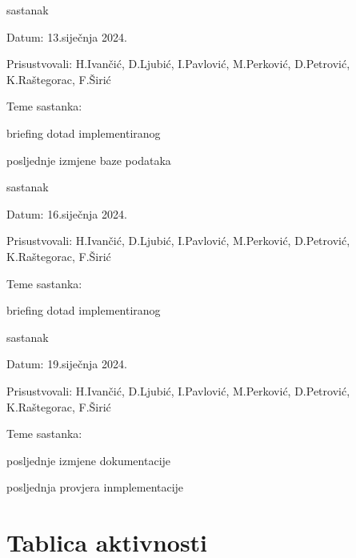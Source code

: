 \begin{packed_enum}
						\item  sastanak
		\begin{packed_item}
				\item Datum: 13.siječnja 2024.
				\item Prisustvovali: H.Ivančić, D.Ljubić, I.Pavlović, M.Perković, D.Petrović, K.Raštegorac, F.Širić
				\item Teme sastanka:
				\begin{packed_item}
					\item briefing dotad implementiranog
					\item posljednje izmjene baze podataka
				\end{packed_item}
			\end{packed_item}
			
						\item  sastanak
					\begin{packed_item}
				\item Datum: 16.siječnja 2024.
				\item Prisustvovali: H.Ivančić, D.Ljubić, I.Pavlović, M.Perković, D.Petrović, K.Raštegorac, F.Širić
				\item Teme sastanka:
				\begin{packed_item}
					\item briefing dotad implementiranog
				\end{packed_item}
			\end{packed_item}
			
						\item  sastanak					\begin{packed_item}
				\item Datum: 19.siječnja 2024.
				\item Prisustvovali: H.Ivančić, D.Ljubić, I.Pavlović, M.Perković, D.Petrović, K.Raštegorac, F.Širić
				\item Teme sastanka:
				\begin{packed_item}
					\item posljednje izmjene dokumentacije
					\item posljednja provjera inmplementacije
				\end{packed_item}
			\end{packed_item}
			
			
			
			
		\end{packed_enum}
		
		\eject
		\section*{Tablica aktivnosti}
		
